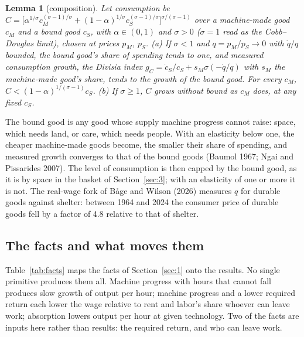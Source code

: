 \documentclass[12pt]{article}
\theoremstyle{plain}
\newtheorem{lemma}{Lemma}
\begin{document}
\begin{lemma}[composition]\label{lem:3}
Let consumption be $C=\bigl[\alpha^{1/\sigma}c_M^{(\sigma-1)/\sigma}+(1-\alpha)^{1/\sigma}c_S^{(\sigma-1)/\sigma}\bigr]^{\sigma/(\sigma-1)}$ over a machine-made good $c_M$ and a bound good $c_S$, with $\alpha\in(0,1)$ and $\sigma>0$ ($\sigma=1$ read as the Cobb--Douglas limit), chosen at prices $p_M$, $p_S$.
(a) If $\sigma<1$ and $q=p_M/p_S\to0$ with $\dot q/q$ bounded, the bound good's share of spending tends to one, and measured consumption growth, the Divisia index $g_C=\dot c_S/c_S+s_M\sigma(-\dot q/q)$ with $s_M$ the machine-made good's share, tends to the growth of the bound good. For every $c_M$, $C<(1-\alpha)^{1/(\sigma-1)}c_S$.
(b) If $\sigma\ge1$, $C$ grows without bound as $c_M$ does, at any fixed $c_S$.
\end{lemma}

The bound good is any good whose supply machine progress cannot raise: space, which needs land, or care, which needs people. With an elasticity below one, the cheaper machine-made goods become, the smaller their share of spending, and measured growth converges to that of the bound goods (Baumol 1967; Ngai and Pissarides 2007). The level of consumption is then capped by the bound good, as it is by space in the basket of Section~\ref{sec:3}; with an elasticity of one or more it is not. The real-wage fork of B\r{a}ge and Wilson (2026) measures $q$ for durable goods against shelter: between 1964 and 2024 the consumer price of durable goods fell by a factor of 4.8 relative to that of shelter.

\subsection{The facts and what moves them}\label{sec:4.5}

Table~\ref{tab:facts} maps the facts of Section~\ref{sec:1} onto the results. No single primitive produces them all. Machine progress with hours that cannot fall produces slow growth of output per hour; machine progress and a lower required return each lower the wage relative to rent and labor's share whoever can leave work; absorption lowers output per hour at given technology. Two of the facts are inputs here rather than results: the required return, and who can leave work.
\end{document}
